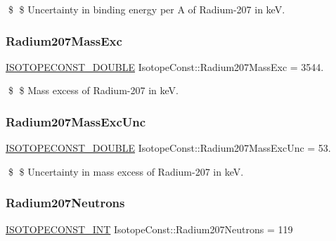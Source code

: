 \$ \$ Uncertainty in binding energy per A of Radium-\/207 in keV. \mbox{\label{group___isotope_const-_radium-_ra207_ga715af263a871ca878bd813e747bb8aae}} 
\subsubsection{\texorpdfstring{Radium207\+Mass\+Exc}{Radium207MassExc}}
{\footnotesize\ttfamily \mbox{\hyperlink{group___isotope_const-_macros_ga8f45a7272ce02c0b4c65c44636ed719a}{I\+S\+O\+T\+O\+P\+E\+C\+O\+N\+S\+T\+\_\+\+D\+O\+U\+B\+LE}} Isotope\+Const\+::\+Radium207\+Mass\+Exc = 3544.}

\$ \$ Mass excess of Radium-\/207 in keV. \mbox{\label{group___isotope_const-_radium-_ra207_ga42267c5f751524bcb2c1006f340b4160}} 
\subsubsection{\texorpdfstring{Radium207\+Mass\+Exc\+Unc}{Radium207MassExcUnc}}
{\footnotesize\ttfamily \mbox{\hyperlink{group___isotope_const-_macros_ga8f45a7272ce02c0b4c65c44636ed719a}{I\+S\+O\+T\+O\+P\+E\+C\+O\+N\+S\+T\+\_\+\+D\+O\+U\+B\+LE}} Isotope\+Const\+::\+Radium207\+Mass\+Exc\+Unc = 53.}

\$ \$ Uncertainty in mass excess of Radium-\/207 in keV. \mbox{\label{group___isotope_const-_radium-_ra207_ga5020636d6bceacd818600e096fb8bb4b}} 
\subsubsection{\texorpdfstring{Radium207\+Neutrons}{Radium207Neutrons}}
{\footnotesize\ttfamily \mbox{\hyperlink{group___isotope_const-_macros_ga5f18360b3e99483a35c32d789e62621c}{I\+S\+O\+T\+O\+P\+E\+C\+O\+N\+S\+T\+\_\+\+I\+NT}} Isotope\+Const\+::\+Radium207\+Neutrons = 119}

